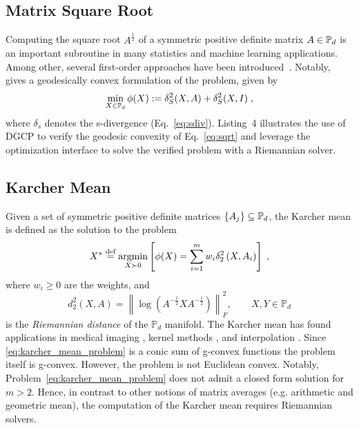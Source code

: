 \documentclass[twoside,11pt]{article}
\begin{document}
\subsection{Matrix Square Root}
Computing the square root $A^{\frac{1}{2}}$ of a symmetric positive definite matrix $A \in \mathbb{P}_d$ is an important subroutine in many statistics and machine learning applications. Among other, several first-order approaches have been introduced~\citep{jain2017global,sra2015matrix}. Notably,~\cite{sra2015matrix} gives a geodesically convex formulation of the problem, given by
\begin{equation}\label{eq:sqrt}
    \min _{X \in \mathbb{P}_d} \phi(X) := \delta_S^2(X, A)+\delta_S^2(X, I) \; ,
\end{equation}
where $\delta_s$ denotes the s-divergence (Eq.~\ref{eq:sdiv}). Listing~4 %
illustrates the use of DGCP to verify the geodesic convexity of Eq.~\ref{eq:sqrt} and leverage the optimization interface to solve the verified problem with a Riemannian solver.

\subsection{Karcher Mean}\label{sec:karcher_mean}

Given a set of symmetric positive definite matrices $\{A_j\} \subseteq \mathbb{P}_d$, the Karcher mean is defined as the solution to the problem
\begin{equation}\label{eq:karcher_mean_problem}
    X^* \stackrel{\text{def}}{=} \underset{X \succ 0}{\operatorname{argmin}}\left[\phi(X)=\sum_{i=1}^m w_i \delta_2^2\left(X, A_i\right)\right] \; ,
\end{equation}
where $w_i \geq 0$ are the weights, and 
\begin{equation}
    d^2_2(X, A) = \left \| \log \left(A^{-\frac{1}{2}}X A^{-\frac{1}{2}} \right)\right \|_F^2,
    \qquad X,Y \in \mathbb{P}_d
\end{equation}
is the \textit{Riemannian distance} of the $\mathbb{P}_d$ manifold. The Karcher mean has found applications in medical imaging \citep{Carmichael2013-wq}, kernel methods \citep{clustering}, and interpolation \citep{absil_interpolation}. Since \eqref{eq:karcher_mean_problem} is a conic sum of g-convex functions the problem itself is g-convex. However, the problem is not Euclidean convex. Notably, Problem~\ref{eq:karcher_mean_problem} does not admit a closed form solution for $m>2$. Hence, in contrast to other notions of matrix averages (e.g. arithmetic and geometric mean), the computation of the Karcher mean requires Riemannian solvers.
\end{document}
